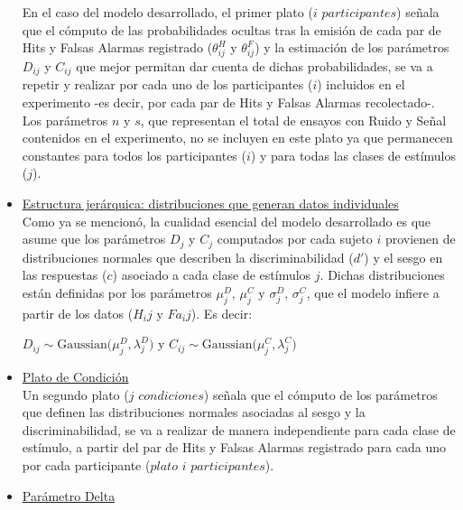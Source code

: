 \begin{itemize}
En el caso del modelo desarrollado, el primer plato ($i$ $participantes$) señala que el cómputo de las probabilidades ocultas tras la emisión de cada par de Hits y Falsas Alarmas registrado ($\theta^H_{ij}$ y $\theta^F_{ij}$) y la estimación de los parámetros $D_{ij}$ y $C_{ij}$ que mejor permitan dar cuenta de dichas probabilidades, se va a repetir y realizar por cada uno de los participantes ($i$) incluidos en el experimento -es decir, por cada par de Hits y Falsas Alarmas recolectado-. Los parámetros $n$ y $s$, que representan el total de ensayos con Ruido y Señal contenidos en el experimento, no se incluyen en este plato ya que permanecen constantes para todos los participantes ($i$) y para todas las clases de estímulos ($j$).\\

\pagebreak
\item \underline{Estructura jerárquica: distribuciones que generan datos individuales}\\

Como ya se mencionó, la cualidad esencial del modelo desarrollado es que asume que los parámetros $D_{j}$ y $C_{j}$ computados por cada sujeto $i$ provienen de distribuciones normales que describen la discriminabilidad ($d'$) y el sesgo en las respuestas ($c$) asociado a cada clase de estímulos $j$. Dichas distribuciones están definidas por los parámetros $\mu^D_{j}$, $\mu^C_{j}$ y $\sigma^D_{j}$, $\sigma^C_{j}$, que el modelo infiere a partir de los datos ($H_ij$ y $Fa_ij$). Es decir:

\begin{center}
$D_{ij}\sim \mathrm{Gaussian}\bigl(\mu^D_{j},\lambda^D_{j})$ \qquad y \qquad $C_{ij}\sim \mathrm{Gaussian}\bigl(\mu^C_{j},\lambda^C_{j})$\\
\end{center}

\item \underline{Plato de Condición}\\

Un segundo plato ($j$ $condiciones$) señala que el cómputo de los parámetros que definen las distribuciones normales asociadas al sesgo y la discriminabilidad, se va a realizar de manera independiente para cada clase de estímulo, a partir del par de Hits y Falsas Alarmas registrado para cada uno por cada participante ($plato$ $i$ $participantes$).\\

\item \underline{Parámetro Delta}\\


\end{itemize}
